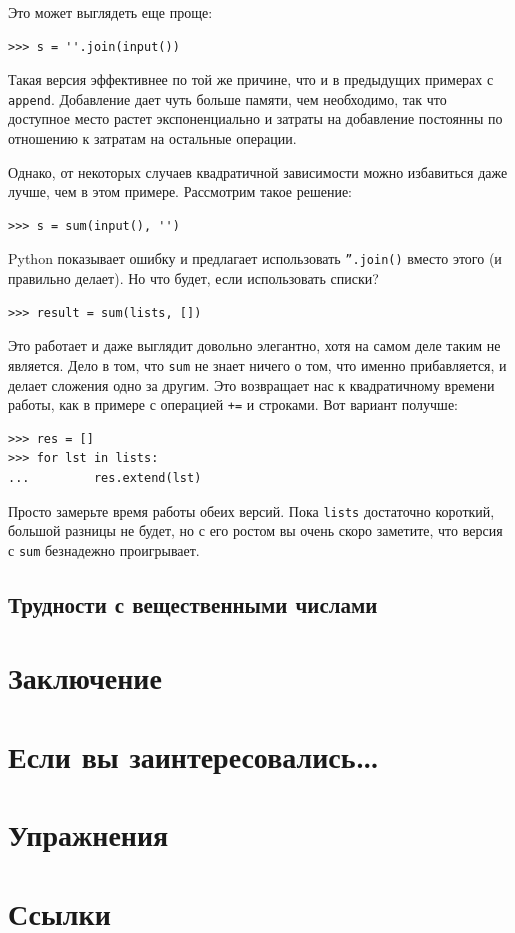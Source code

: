 Это может выглядеть еще проще:

\begin{lstlisting}
>>> s = ''.join(input())
\end{lstlisting}

Такая версия эффективнее по той же причине, что и в предыдущих примерах с \texttt{append}. Добавление дает чуть больше памяти, чем необходимо, так что доступное место растет экспоненциально и затраты на добавление постоянны по отношению к затратам на остальные операции. 

Однако, от некоторых случаев квадратичной зависимости можно избавиться даже лучше, чем в этом примере. Рассмотрим такое решение:

\begin{lstlisting}
>>> s = sum(input(), '')
\end{lstlisting}

Python показывает ошибку и предлагает использовать \texttt{''.join()} вместо этого (и правильно делает). Но что будет, если использовать списки?

\begin{lstlisting}
>>> result = sum(lists, [])
\end{lstlisting}

Это работает и даже выглядит довольно элегантно, хотя на самом деле таким не является. Дело в том, что \texttt{sum} не знает ничего о том, что именно прибавляется, и делает сложения одно за другим. Это возвращает нас к квадратичному времени работы, как в примере с операцией \texttt{+=} и строками. Вот вариант получше:
\begin{lstlisting}
>>> res = []
>>> for lst in lists:
...			res.extend(lst)
\end{lstlisting}

Просто замерьте время работы обеих версий. Пока \texttt{lists} достаточно короткий, большой разницы не будет, но с его ростом вы очень скоро заметите, что версия с \texttt{sum} безнадежно проигрывает.

\subsection{Трудности с вещественными числами}



\section{Заключение}
\section{Если вы заинтересовались…}
\section{Упражнения}
\section{Ссылки}





